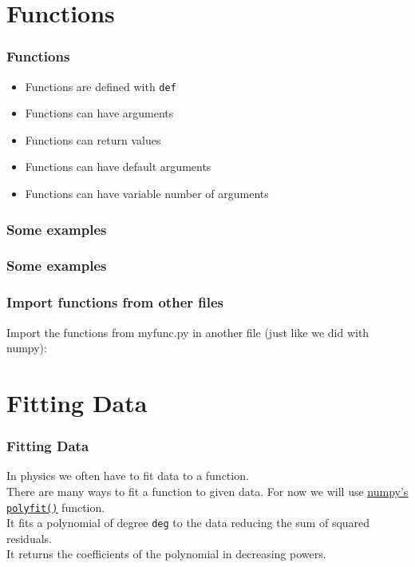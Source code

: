 \documentclass{beamer}
\newcommand{\hrefu}[2]{\underline{\href{#1}{#2}}}
\begin{document}
\section{Functions}
\begin{frame}
  \frametitle{Functions}
  \begin{itemize}
    \item Functions are defined with \texttt{def}
    \item Functions can have arguments
    \item Functions can return values
    \item Functions can have default arguments
    \item Functions can have variable number of arguments
  \end{itemize}
\end{frame}

\begin{frame}
  \frametitle{Some examples}
  
\end{frame}
\begin{frame}
  \frametitle{Some examples}
  
\end{frame}
\begin{frame}
  \frametitle{Import functions from other files}
  
  \vspace{5mm}
  Import the functions from myfunc.py in another file (just like we did with numpy):
  
\end{frame}
\section{Fitting Data}
\begin{frame}
  \frametitle{Fitting Data}
  In physics we often have to fit data to a function. \\ There are many ways to fit a function to given data. For now we will use \hrefu{https://numpy.org/}{numpy's} \hrefu{https://numpy.org/doc/stable/reference/generated/numpy.polyfit.html}{\texttt{polyfit()}} function.\\ \vspace{5mm}
  It fits a polynomial of degree \texttt{deg} to the data reducing the sum of squared residuals.\\ It returns the coefficients of the polynomial in decreasing powers.\\
\end{frame}
\end{document}
